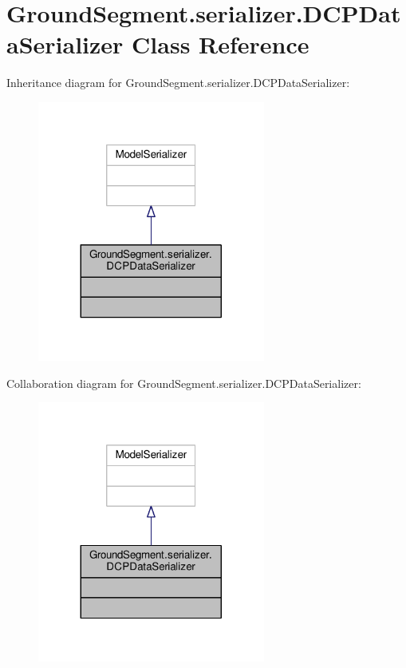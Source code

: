 \hypertarget{class_ground_segment_1_1serializer_1_1_d_c_p_data_serializer}{}\section{Ground\+Segment.\+serializer.\+D\+C\+P\+Data\+Serializer Class Reference}
\label{class_ground_segment_1_1serializer_1_1_d_c_p_data_serializer}


Inheritance diagram for Ground\+Segment.\+serializer.\+D\+C\+P\+Data\+Serializer\+:\nopagebreak
\begin{figure}[H]
\begin{center}
\leavevmode
\includegraphics[width=212pt]{class_ground_segment_1_1serializer_1_1_d_c_p_data_serializer__inherit__graph}
\end{center}
\end{figure}


Collaboration diagram for Ground\+Segment.\+serializer.\+D\+C\+P\+Data\+Serializer\+:\nopagebreak
\begin{figure}[H]
\begin{center}
\leavevmode
\includegraphics[width=212pt]{class_ground_segment_1_1serializer_1_1_d_c_p_data_serializer__coll__graph}
\end{center}
\end{figure}
